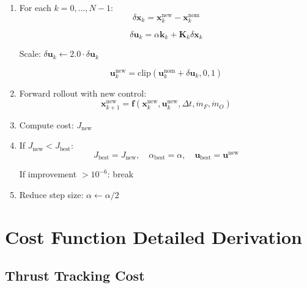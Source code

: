 \documentclass[11pt,a4paper]{article}
\begin{document}
\begin{enumerate}
    \item For each $k = 0, \ldots, N-1$:
    \begin{equation}
    \delta \mathbf{x}_k = \mathbf{x}_k^{\text{new}} - \mathbf{x}_k^{\text{nom}}
    \end{equation}
    
    \begin{equation}
    \delta \mathbf{u}_k = \alpha \mathbf{k}_k + \mathbf{K}_k \delta \mathbf{x}_k
    \end{equation}
    
    Scale: $\delta \mathbf{u}_k \leftarrow 2.0 \cdot \delta \mathbf{u}_k$
    
    \begin{equation}
    \mathbf{u}_k^{\text{new}} = \text{clip}(\mathbf{u}_k^{\text{nom}} + \delta \mathbf{u}_k, 0, 1)
    \end{equation}
    
    \item Forward rollout with new control:
    \begin{equation}
    \mathbf{x}_{k+1}^{\text{new}} = \mathbf{f}(\mathbf{x}_k^{\text{new}}, \mathbf{u}_k^{\text{new}}, \Delta t, \dot{m}_F, \dot{m}_O)
    \end{equation}
    
    \item Compute cost: $J_{\text{new}}$
    
    \item If $J_{\text{new}} < J_{\text{best}}$:
    \begin{equation}
    J_{\text{best}} = J_{\text{new}}, \quad \alpha_{\text{best}} = \alpha, \quad \mathbf{u}_{\text{best}} = \mathbf{u}^{\text{new}}
    \end{equation}
    
    If improvement $> 10^{-6}$: break
    
    \item Reduce step size: $\alpha \leftarrow \alpha / 2$
\end{enumerate}

\section{Cost Function Detailed Derivation}

\subsection{Thrust Tracking Cost}
\end{document}
